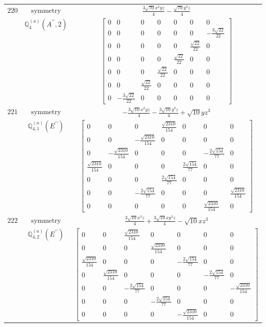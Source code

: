 \documentclass[fleqn,8pt,landscape]{jsarticle}
\begin{document}
\begin{longtable}{ccc}
$ 220 $ & $ \text{symmetry} $ & $ \frac{3 \sqrt{70} x^{2} y z}{4} - \frac{\sqrt{70} y^{3} z}{4} $ \\
$  $ & $ \mathbb{Q}_{4}^{(a)}(A^{\prime\prime},2) $ & $ \begin{bmatrix} 0 & 0 & 0 & 0 & 0 & 0 & 0 \\ 0 & 0 & 0 & 0 & 0 & 0 & - \frac{3 \sqrt{22}}{22} \\ 0 & 0 & 0 & 0 & 0 & \frac{\sqrt{22}}{22} & 0 \\ 0 & 0 & 0 & 0 & \frac{\sqrt{22}}{22} & 0 & 0 \\ 0 & 0 & 0 & \frac{\sqrt{22}}{22} & 0 & 0 & 0 \\ 0 & 0 & \frac{\sqrt{22}}{22} & 0 & 0 & 0 & 0 \\ 0 & - \frac{3 \sqrt{22}}{22} & 0 & 0 & 0 & 0 & 0 \end{bmatrix} $ \\ \hline
$ 221 $ & $ \text{symmetry} $ & $ - \frac{3 \sqrt{10} x^{2} y z}{4} - \frac{3 \sqrt{10} y^{3} z}{4} + \sqrt{10} y z^{3} $ \\
$  $ & $ \mathbb{Q}_{4,1}^{(a)}(E^{\prime\prime}) $ & $ \begin{bmatrix} 0 & 0 & 0 & \frac{\sqrt{2310}}{154} & 0 & 0 & 0 \\ 0 & 0 & - \frac{\sqrt{2310}}{154} & 0 & 0 & 0 & 0 \\ 0 & - \frac{\sqrt{2310}}{154} & 0 & 0 & 0 & - \frac{2 \sqrt{154}}{77} & 0 \\ \frac{\sqrt{2310}}{154} & 0 & 0 & 0 & \frac{2 \sqrt{154}}{77} & 0 & 0 \\ 0 & 0 & 0 & \frac{2 \sqrt{154}}{77} & 0 & 0 & 0 \\ 0 & 0 & - \frac{2 \sqrt{154}}{77} & 0 & 0 & 0 & \frac{\sqrt{2310}}{154} \\ 0 & 0 & 0 & 0 & 0 & \frac{\sqrt{2310}}{154} & 0 \end{bmatrix} $ \\ \hline
$ 222 $ & $ \text{symmetry} $ & $ \frac{3 \sqrt{10} x^{3} z}{4} + \frac{3 \sqrt{10} x y^{2} z}{4} - \sqrt{10} x z^{3} $ \\
$  $ & $ \mathbb{Q}_{4,2}^{(a)}(E^{\prime\prime}) $ & $ \begin{bmatrix} 0 & 0 & \frac{\sqrt{2310}}{154} & 0 & 0 & 0 & 0 \\ 0 & 0 & 0 & \frac{\sqrt{2310}}{154} & 0 & 0 & 0 \\ \frac{\sqrt{2310}}{154} & 0 & 0 & 0 & - \frac{2 \sqrt{154}}{77} & 0 & 0 \\ 0 & \frac{\sqrt{2310}}{154} & 0 & 0 & 0 & - \frac{2 \sqrt{154}}{77} & 0 \\ 0 & 0 & - \frac{2 \sqrt{154}}{77} & 0 & 0 & 0 & - \frac{\sqrt{2310}}{154} \\ 0 & 0 & 0 & - \frac{2 \sqrt{154}}{77} & 0 & 0 & 0 \\ 0 & 0 & 0 & 0 & - \frac{\sqrt{2310}}{154} & 0 & 0 \end{bmatrix} $ \\ \hline

\end{longtable}
\end{document}
